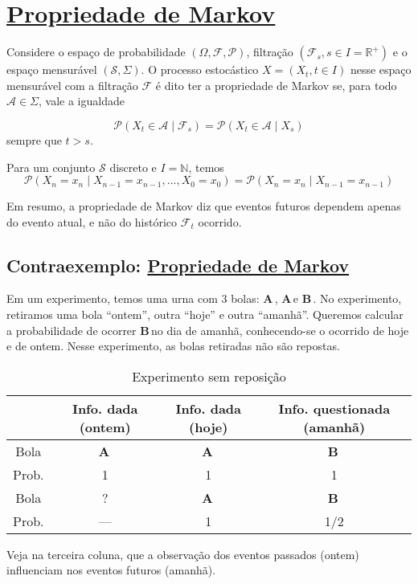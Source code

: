 \documentclass[12pt,a4paper]{article}
\def\A{$\mathbf{A}$\,}
\def\B{$\mathbf{B}$\,}
\def\F{\mathcal{F}}
\def\P{\mathcal{P}}
\def\NN{\mathbb{N}}
\def\RR{\mathbb{R}}
\def\S{\mathcal{S}}
\begin{document}
\section{\href{https://pt.wikipedia.org/wiki/Propriedade_de_Markov}{Propriedade de Markov}}
Considere o espaço de probabilidade $(\Omega,\F,\P)$, filtração $(\F_s,s\in I=\RR^+)$ e o espaço mensurável $(\S,\Sigma)$. O processo estocástico $X=(X_t,t\in I)$ nesse espaço mensurável com a filtração $\F$ é dito ter a propriedade de Markov se, para todo $\mathcal{A}\in\Sigma$, vale a igualdade

\[
\P(X_t\in\mathcal{A}\;|\;\F_s)=\P(X_t\in\mathcal{A}\;|\;X_s)
\]
sempre que $t>s$.

Para um conjunto $\S$ discreto e $I=\NN$, temos 
\[
\P(X_n=x_n\;|\;X_{n-1}=x_{n-1},...,X_0=x_0)=\P(X_n=x_n\;|\;X_{n-1}=x_{n-1})
\]





Em resumo, a propriedade de Markov diz que eventos futuros dependem apenas do evento atual, e não do histórico $\F_t$ ocorrido.



\subsection{Contraexemplo: \href{https://math.stackexchange.com/questions/89394/example-of-a-stochastic-process-which-does-not-have-the-markov-property}{Propriedade de Markov}}
Em um experimento, temos uma urna com 3 bolas: \A, \A e \B. No experimento, retiramos uma bola ``ontem'', outra ``hoje'' e outra ``amanhã''. Queremos calcular a probabilidade de ocorrer \B no dia de amanhã, conhecendo-se o ocorrido de hoje e de ontem. Nesse experimento, as bolas retiradas não são repostas.

\begin{table}[H]\centering
\caption{Experimento sem reposição}
\begin{tabular}{|c|c|c|||c|}
\hline
&Info. dada (ontem) & Info. dada (hoje) & Info. questionada (amanhã)\\\hline
Bola & \A & \A & \B\\
Prob. & 1 & 1 & 1\\
\hline\hline
Bola & ? & \A & \B\\
Prob. & --- & 1 & 1/2\\
\hline
\end{tabular}
\end{table}

Veja na terceira coluna, que a observação dos eventos passados (ontem) influenciam nos eventos futuros (amanhã).
\end{document}
